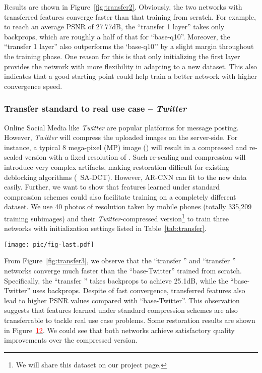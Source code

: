 \documentclass[10pt,twocolumn,letterpaper]{article}
\begin{document}
Results are shown in Figure~\ref{fig:transfer2}. Obviously, the two networks with transferred features converge faster than that training from scratch. For example, to reach an average PSNR of 27.77dB, the ``transfer 1 layer'' takes only  backprops, which are roughly a half of that for ``base-q10''. Moreover, the ``transfer 1 layer'' also outperforms the `base-q10'' by a slight margin throughout the training phase. One reason for this is that only initializing the first layer provides the network with more flexibility in adapting to a new dataset.
This also indicates that a good starting point could help train a better network with higher convergence speed.

\subsubsection{Transfer standard to real use case -- \textit{Twitter}}
\label{sec:transfer3}

Online Social Media like \textit{Twitter} are popular platforms for message posting. However, \textit{Twitter} will compress the uploaded images on the server-side. For instance, a typical 8 mega-pixel (MP) image () will result in a compressed and re-scaled version with a fixed resolution of . Such re-scaling and compression will introduce very complex artifacts, making restoration difficult for existing deblocking algorithms (\eg~SA-DCT). However, AR-CNN can fit to the new data easily. Further, we want to show that features learned under standard compression schemes could also facilitate training on a completely different dataset.
We use 40 photos of resolution  taken by mobile phones (totally 335,209 training subimages) and their \textit{Twitter}-compressed version\footnote{We will share this dataset on our project page.} to train three networks with initialization settings listed in Table~\ref{tab:transfer}.

\begin{figure*}
\vskip -0.2cm
\small
\begin{center}
 \texttt{[image: pic/fig-last.pdf]}
\label{fig:last-fig}
\end{center}
\vskip -1.3cm
\end{figure*}

From Figure~\ref{fig:transfer3}, we observe that the ``transfer '' and ``transfer '' networks converge much faster than the ``base-Twitter'' trained from scratch. Specifically, the ``transfer '' takes  backprops to achieve 25.1dB, while the ``base-Twitter'' uses  backprops. Despite of fast convergence, transferred features also lead to higher PSNR values compared with ``base-Twitter''. This observation suggests that features learned under standard compression schemes are also transferrable to tackle real use case problems.
Some restoration results are shown in Figure~\hyperlink{page.8}{\textcolor{red}{12}}. We could see that both networks achieve satisfactory quality improvements over the compressed version.
\end{document}
